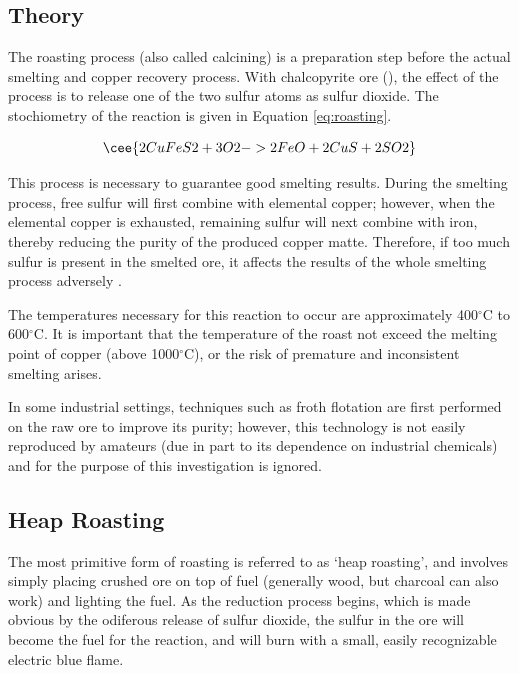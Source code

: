 \subsection{Theory}


The roasting process (also called calcining) is a preparation step before the
actual smelting and copper recovery process.  With chalcopyrite ore
(), the effect of the process is to release one of the two sulfur
atoms as sulfur dioxide.  The stochiometry of the reaction is given in Equation
\ref{eq:roasting}.

\begin{equation}
\cee{2 CuFeS2 + 3 O2 -> 2 FeO + 2 CuS + 2 SO2}
\label{eq:roasting}
\end{equation}

This process is necessary to guarantee good smelting results.  During the
smelting process, free sulfur will first combine with elemental copper; however,
when the elemental copper is exhausted, remaining sulfur will next combine with
iron, thereby reducing the purity of the produced copper matte.  Therefore, if
too much sulfur is present in the smelted ore, it affects the results of the
whole smelting process adversely \cite{peters1887}.

The temperatures necessary for this reaction to occur are approximately
400$^\circ$C to 600$^\circ$C.  It is important that the temperature of the roast
not exceed the melting point of copper (above 1000$^\circ$C), or the risk of
premature and inconsistent smelting arises.

In some industrial settings, techniques such as froth flotation are first
performed on the raw ore to improve its purity; however, this technology is not
easily reproduced by amateurs (due in part to its dependence on industrial
chemicals) and for the purpose of this investigation is ignored.

\subsection{Heap Roasting}

The most primitive form of roasting is referred to as `heap roasting', and
involves simply placing crushed ore on top of fuel (generally wood, but charcoal
can also work) and lighting the fuel.  As the reduction process begins, which is
made obvious by the odiferous release of sulfur dioxide, the sulfur in the ore
will become the fuel for the reaction, and will burn with a small, easily
recognizable electric blue flame.


